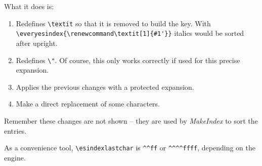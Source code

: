 \documentclass{article}
\begin{document}
What it does is:
\begin{enumerate}
\item Redefines \verb|\textit| so that it is removed to build the key.
With \verb|\everyesindex{\renewcommand\textit[1]{#1'}}| italics would
be sorted after upright.

\item Redefines \verb|\"|. Of course, this only works correctly if used
for this precise expansion.

\item Applies the previous changes with a protected expansion.

\item Make a direct replacement of some characters.

\end{enumerate}
Remember these changes are not shown -- they are used by
\textit{MakeIndex} to sort the entries.

As a convenience tool, \verb|\esindexlastchar| is \verb|^^ff| or
\verb|^^^^ffff|, depending on the engine.
\end{document}
